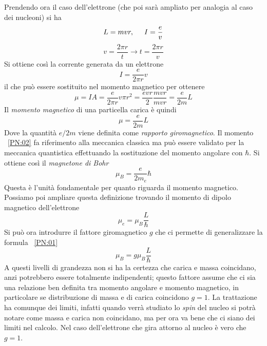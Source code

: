 Prendendo ora il caso dell'elettrone (che poi sarà ampliato per analogia al caso dei nucleoni) si ha 
\begin{equation}
L=mvr, \hspace{0.5cm}I=\frac{e}{v}
\end{equation}
\begin{equation}
v=\frac{2\pi r}{t}\to t=\frac{2\pi r}{v}
\end{equation}
Si ottiene così la corrente generata da un elettrone
\begin{equation}
I=\frac{e}{2\pi r}v
\end{equation}
il che può essere sostituito nel momento magnetico per ottenere
\begin{equation}
\mu=IA=\frac{e}{2\pi r}v\pi r^2=\frac{evr}{2}\frac{mvr}{mvr}=\frac{e}{2m}L
\end{equation}
Il \emph{momento magnetico} di una particella carica è quindi
\begin{equation}
\mu=\frac{e}{2m}L
\label{PN:02}
\end{equation}
Dove la quantità $e/2m$ viene definita come \emph{rapporto giromagnetico}. 
Il momento ~\eqref{PN:02} fa riferimento alla meccanica classica ma può essere validato per la meccanica quantistica effettuando la sostituzione del momento angolare con $\hbar$.
Si ottiene così il \emph{magnetone di Bohr}
\begin{equation}
\mu_B=\frac{e}{2m_e}\hbar
\end{equation}
Questa è l'unità fondamentale per quanto riguarda il momento magnetico.
Possiamo poi ampliare questa definizione trovando il momento di dipolo magnetico dell'elettrone
\begin{equation}
\mu_e =\mu_B \frac{L}{\hbar}
\label{PN:01}
\end{equation}
Si può ora introdurre il fattore giromagnetico $g$ che ci permette di generalizzare la formula ~\eqref{PN:01}
\begin{equation}
\mu_B =g\mu_B \frac{L}{\hbar}
\end{equation}
A questi livelli di grandezza non si ha la certezza che carica e massa coincidano, anzi potrebbero essere totalmente indipendenti; questo fattore assume che ci sia una relazione ben definita tra momento angolare e momento magnetico, in particolare se distribuzione di massa e di carica coincidono $g=1$.
La trattazione ha comunque dei limiti, infatti quando verrà studiato lo \emph{spin} del nucleo si potrà notare come massa e carica non coincidano, ma per ora va bene che ci siano dei limiti nel calcolo.
Nel caso dell'elettrone che gira attorno al nucleo è vero che $g=1$.

